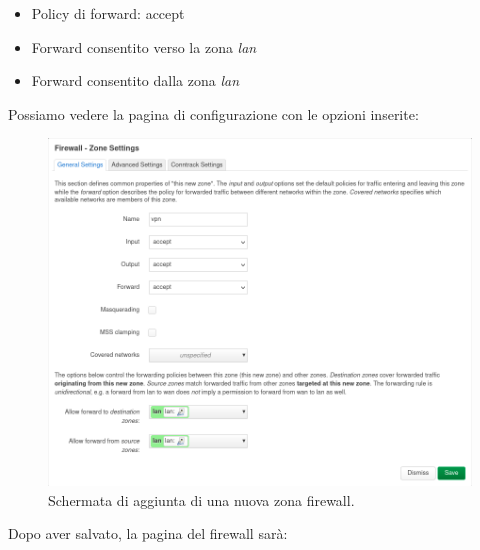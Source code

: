 \begin{itemize}[noitemsep]
    \itemsep0em
    \item Policy di forward: accept
    \item Forward consentito verso la zona \textit{lan}
    \item Forward consentito dalla zona \textit{lan}
\end{itemize}

Possiamo vedere la pagina di configurazione con le opzioni inserite:

\begin{figure}[H]
    \centering
    \includegraphics[width=1\linewidth]{immagini/LuCI_firewall_vpn1}
    \caption{Schermata di aggiunta di una nuova zona firewall.}
    \label{fig:luci-firewall-vpn}
\end{figure}

Dopo aver salvato, la pagina del firewall sarà:

